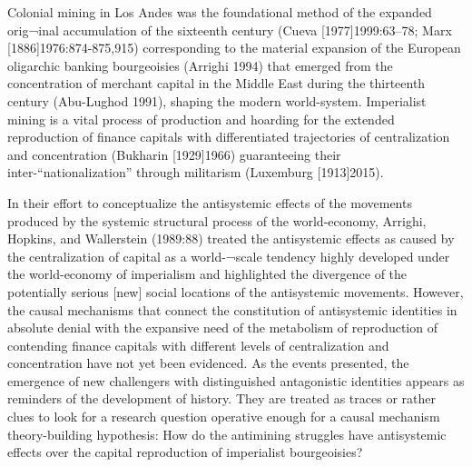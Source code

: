 \documentclass[]{interact}
\theoremstyle{plain}%
\theoremstyle{definition}
\theoremstyle{remark}
\begin{document}
Colonial mining in Los Andes was the foundational method of the expanded orig¬inal accumulation of the sixteenth century (Cueva [1977]1999:63–78; Marx [1886]1976:874-875,915) corresponding to the material expansion of the European oligarchic banking bourgeoisies (Arrighi 1994) that emerged from the concentration of merchant capital in the Middle East during the thirteenth century (Abu-Lughod 1991), shaping the modern world-system. Imperialist mining is a vital process of production and hoarding for the extended reproduction of finance capitals with differentiated trajectories of centralization and concentration (Bukharin [1929]1966) guaranteeing their inter-“nationalization” through militarism (Luxemburg [1913]2015).

In their effort to conceptualize the antisystemic effects of the movements produced by the systemic structural process of the world-economy, Arrighi, Hopkins, and Wallerstein (1989:88) treated the antisystemic effects as caused by the centralization of capital as a world-¬scale tendency highly developed under the world-economy of imperialism and highlighted the divergence of the potentially serious [new] social locations of the antisystemic movements. However, the causal mechanisms that connect the constitution of antisystemic identities in absolute denial with the expansive need of the metabolism of reproduction of contending finance capitals with different levels of centralization and concentration have not yet been evidenced. As the events presented, the emergence of new challengers with distinguished antagonistic identities appears as reminders of the development of history. They are treated as traces or rather clues to look for a research question operative enough for a causal mechanism theory-building hypothesis: How do the antimining struggles have antisystemic effects over the capital reproduction of imperialist bourgeoisies?
\end{document}
